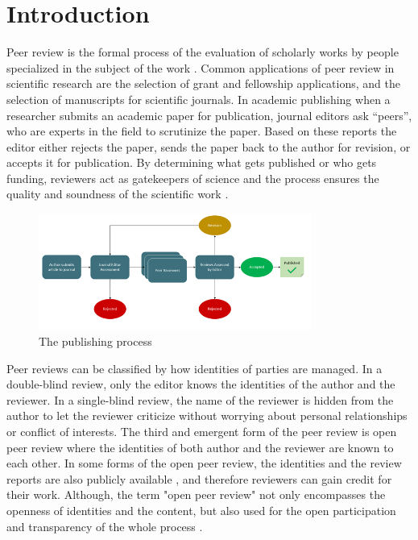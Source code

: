 
\chapter{Introduction}\label{chapter:introduction}
Peer review is the formal process of the evaluation of scholarly works by people specialized in the subject of the work \parencite[p.~864]{Moxham.2018}. Common applications of peer review in scientific research are the selection of grant and fellowship applications, and the selection of manuscripts for scientific journals. In academic publishing when a researcher submits an academic paper for publication, journal editors ask “peers”, who are experts in the field to scrutinize the paper. Based on these reports the editor either rejects the paper, sends the paper back to the author for revision, or accepts it for publication. By determining what gets published or who gets funding, reviewers act as gatekeepers of science and the process ensures the quality and soundness of the scientific work \parencite{Bornmann.2011}.

\begin{figure}[htpb]
  \centering
  \includegraphics[width=0.8\textwidth]{figures/publishing-process.png}
  \caption{The publishing process} \label{fig:publishing-process}
\end{figure}

Peer reviews can be classified by how identities of parties are managed. In a double-blind review, only the editor knows the identities of the author and the reviewer. In a single-blind review, the name of the reviewer is hidden from the author to let the reviewer criticize without worrying about personal relationships or conflict of interests. The third and emergent form of the peer review is open peer review where the identities of both author and the reviewer are known to each other. In some forms of the open peer review, the identities and the review reports are also publicly available \parencite[4]{HorbachS.P.J.M..2017}, and therefore reviewers can gain credit for their work. Although, the term "open peer review" not only encompasses the openness of identities and the content, but also used for the open participation and transparency of the whole process \parencite{RossHellauer.2017}.


